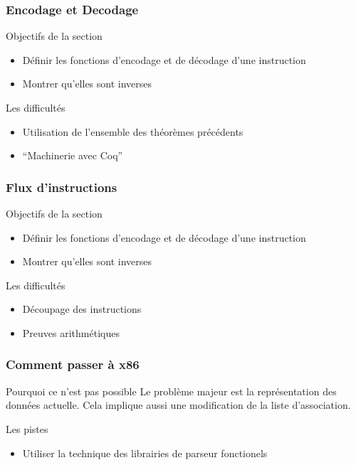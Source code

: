 \documentclass{beamer}
\begin{document}
\begin{frame}[b,fragile]
  \frametitle{Encodage et Decodage}
  \begin{block}{Objectifs de la section}
    \begin{itemize}
    \item Définir les fonctions d'encodage et de décodage d'une instruction
    \item Montrer qu'elles sont inverses
    \end{itemize}   
  \end{block}  
  
\begin{block}{Les difficultés}
  \begin{itemize}
  \item Utilisation de l'ensemble des théorèmes précédents
  \item ``Machinerie avec Coq''
  \end{itemize}   
\end{block}
  
\end{frame}


\begin{frame}
  \frametitle{Flux d'instructions}
  \begin{block}{Objectifs de la section}
    \begin{itemize}
    \item Définir les fonctions d'encodage et de décodage d'une instruction
    \item Montrer qu'elles sont inverses
    \end{itemize}   
  \end{block}  
  
\begin{block}{Les difficultés}
  \begin{itemize}
  \item Découpage des instructions
  \item Preuves arithmétiques
  \end{itemize}   
\end{block}
  
\end{frame}


\begin{frame}
  \frametitle{Comment passer à x86}
  
  \begin{block}{Pourquoi ce n'est pas possible}
    Le problème majeur est la représentation des données actuelle.
    Cela implique aussi une modification de la liste d'association.
  \end{block}  
  
\begin{block}{Les pistes}
  \begin{itemize}
  \item Utiliser la technique des librairies de parseur fonctionels
  \end{itemize}   
\end{block}
  
\end{frame}
\end{document}
